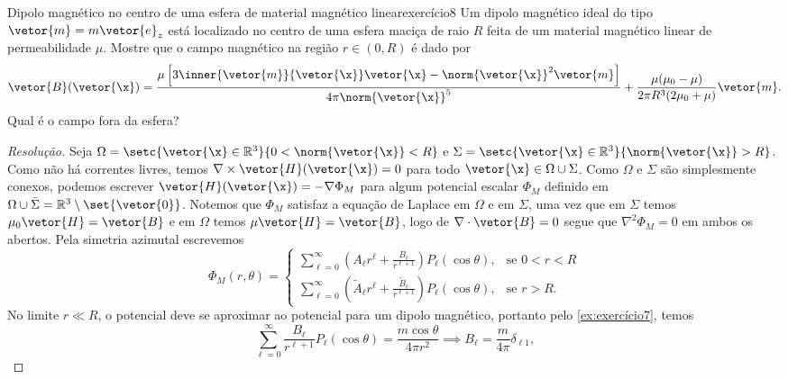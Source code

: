 \begin{exercício}{Dipolo magnético no centro de uma esfera de material magnético linear}{exercício8}
    Um dipolo magnético ideal do tipo \(\vetor{m} = m\vetor{e}_z\) está localizado no centro de uma esfera maciça de raio \(R\) feita de um material magnético linear de permeabilidade \(\mu\). Mostre que o campo magnético na região \(r \in (0,R)\) é dado por
    \begin{equation*}
        \vetor{B}(\vetor{\x}) = \frac{\mu\left[3\inner{\vetor{m}}{\vetor{\x}}\vetor{\x} - \norm{\vetor{\x}}^2\vetor{m}\right]}{4\pi\norm{\vetor{\x}}^5} + \frac{\mu(\mu_0 - \mu)}{2\pi R^3(2\mu_0 + \mu)}\vetor{m}.
    \end{equation*}
    Qual é o campo fora da esfera?
\end{exercício}
\begin{proof}[Resolução]
    Seja \(\Omega = \setc{\vetor{\x} \in \mathbb{R}^3}{0 < \norm{\vetor{\x}} < R}\) e \(\Sigma = \setc{\vetor{\x}\in \mathbb{R}^3}{\norm{\vetor{\x}} > R}\). Como não há correntes livres, temos \(\nabla \times \vetor{H}(\vetor{\x}) = 0\) para todo \(\vetor{\x} \in \Omega \cup \Sigma\). Como \(\Omega\) e \(\Sigma\) são simplesmente conexos, podemos escrever \(\vetor{H}(\vetor{\x}) = - \nabla \Phi_M\) para algum potencial escalar \(\Phi_M\) definido em \(\Omega \cup \bar{\Sigma} = \mathbb{R}^3 \setminus \set{\vetor{0}}\). Notemos que \(\Phi_M\) satisfaz a equação de Laplace em \(\Omega\) e em \(\Sigma\), uma vez que em \(\Sigma\) temos \(\mu_0 \vetor{H} = \vetor{B}\) e em \(\Omega\) temos \(\mu \vetor{H} = \vetor{B}\), logo de \(\nabla \cdot \vetor{B} = 0\) segue que \(\nabla^2 \Phi_M = 0\) em ambos os abertos. Pela simetria azimutal escrevemos
    \begin{equation*}
        \Phi_M(r, \theta) = \begin{cases}
            \displaystyle\sum_{\ell = 0}^\infty \left(A_\ell r^\ell + \frac{B_\ell}{r^{\ell + 1}}\right) P_\ell (\cos\theta),&\text{se }0 < r < R\\
            \displaystyle\sum_{\ell = 0}^\infty \left(\tilde{A}_\ell r^\ell + \frac{\tilde{B}_\ell}{r^{\ell + 1}}\right) P_\ell (\cos\theta),&\text{se }r  > R.
        \end{cases}
    \end{equation*}
    No limite \(r \ll R\), o potencial deve se aproximar ao potencial para um dipolo magnético, portanto pelo \cref{ex:exercício7}, temos
    \begin{equation*}
        \sum_{\ell = 0}^\infty \frac{B_\ell}{r^{\ell + 1}}P_\ell(\cos\theta) = \frac{m \cos\theta}{4\pi r^2} \implies  B_{\ell} = \frac{m}{4\pi} \delta_{\ell 1},

\end{equation*}
\end{proof}
